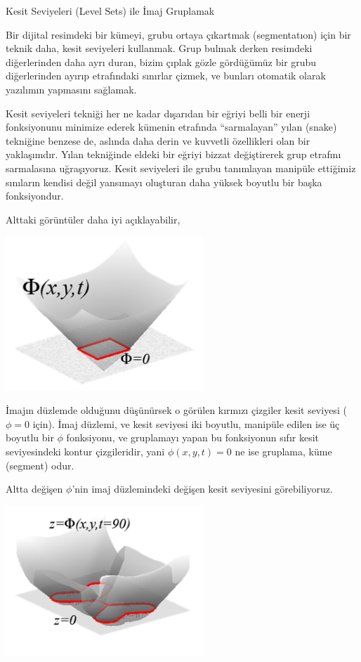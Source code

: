 \documentclass[12pt,fleqn]{article}\usepackage{../../common}
\begin{document}
Kesit Seviyeleri (Level Sets) ile İmaj Gruplamak 

Bir dijital resimdeki bir kümeyi, grubu ortaya çıkartmak (segmentatıon) için bir
teknik daha, kesit seviyeleri kullanmak. Grup bulmak derken resimdeki
diğerlerinden daha ayrı duran, bizim çıplak gözle gördüğümüz bir grubu
diğerlerinden ayırıp etrafındaki sınırlar çizmek, ve bunları otomatik
olarak yazılımın yapmasını sağlamak. 

Kesit seviyeleri tekniği her ne kadar dışarıdan bir eğriyi belli bir enerji
fonksiyonunu minimize ederek kümenin etrafında ``sarmalayan'' yılan (snake)
tekniğine benzese de, aslında daha derin ve kuvvetli özellikleri olan bir
yaklaşımdır. Yılan tekniğinde eldeki bir eğriyi bizzat değiştirerek grup
etrafını sarmalasına uğraşıyoruz. Kesit seviyeleri ile grubu tanımlayan manipüle
ettiğimiz sınıların kendisi değil yansımayı oluşturan daha yüksek boyutlu bir
başka fonksiyondur.

Alttaki görüntüler daha iyi açıklayabilir,

\includegraphics[width=20em]{compscieng_app50lset_02.png}

İmajın düzlemde olduğunu düşünürsek o görülen kırmızı çizgiler kesit seviyesi
($\phi=0$ için). İmaj düzlemi, ve kesit seviyesi iki boyutlu, manipüle edilen
ise üç boyutlu bir $\phi$ fonksiyonu, ve gruplamayı yapan bu fonksiyonun sıfır
kesit seviyesindeki kontur çizgileridir, yani $\phi(x,y,t) = 0$ ne ise gruplama,
küme (segment) odur.

Altta değişen $\phi$'nin imaj düzlemindeki değişen kesit seviyesini görebiliyoruz.

\includegraphics[width=20em]{compscieng_app50lset_01.png}
\end{document}
